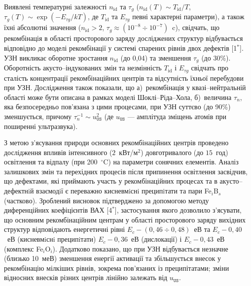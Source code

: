 Виявлені температурні залежності $n_\mathrm{id}$ та $\tau_g$
($n_{\mathrm{id}}(T) \sim T_{\mathrm{id}}/T$,
$\tau_{g}(T)\sim\exp\left(-E_{\tau g}/kT\right)$,
де $T_{\mathrm{id}}$ та $E_{\tau g}$ певні характерні параметри),
а також їхні абсолютні значення ($n_{\mathrm{id}}>2$, $\tau_{g}\approx(10^{-8}\div10^{-7})$~c),
свідчать, що рекомбінація в області просторового заряду досліджених структур
відбувається відповідно до
моделі рекомбінації у системі спарених рівнів двох дефектів
[1$^*$].
УЗН викликає оборотне зростання $n_\mathrm{id}$  (до 0,04) та зменшення $\tau_g$ (до 30\%).
Оборотність акусто--індукованих змін та незмінність $T_{\mathrm{id}}$ і $E_{\tau g}$
свідчать про
сталість концентрації рекомбінаційних центрів та відсутність їхньої перебудови при УЗН.
Дослідження також показали, що
а)~рекомбінація у квазі--нейтральній області може бути описана в рамках моделі Шоклі--Ріда--Хола,
б)~величина $\tau_n$, яка безпосередньо пов'язана з цими процесами,
при УЗН суттєво (до 90\%) зменшується,
причому
$\tau_{n}^{-1}\sim u_\mathtt{US}^2$ (де $u_\mathtt{US}$ --- амплітуда зміщень атомів при поширенні ультразвука).

З метою з'ясування природи основних рекомбінаційних центрів
 проведено дослідження впливів інтенсивного ($2$~кВт/м$^2$) довготривалого (до  $15$~год) освітлення
та відпалу (при 200~$^\circ$C) на параметри сонячних елементів.
Аналіз залишкових змін та перехідних процесів після припинення освітлення засвідчив, що дефектами, які приймають участь у рекомбінаційних процесах та в акусто--дефектнiй взаємодiї є переважно кисневмiснi преципiтати та
пари Fe$_i$B$_s$ (частково).
Зроблений висновок підтверджено за допомогою методу диференційних коефіцієнтів ВАХ
[4$^*$],
застосування якого дозволило з'ясувати, що основним рекомбінаційним центрам у області просторового заряду вихідних структур відповідають енергетичні рівні
$E_c-(0,46\div0,48)$~еВ та $E_c-0,40$~еВ (кисневмiснi преципiтати)
$E_c-0,36$~еВ (дислокації) і
$E_c-0,43$~еВ (комплекс Fe$_i$O$_i$).
Додатково показано, що
при УЗН відбувається незначне (близько 10~меВ) зменшення енергії активації та
збільшується внесок у рекомбінацію мілкіших рівнів, зокрема пов'язаних із преципітатами;
зміни відносних внесків різних центрів лінійно залежать від $u_\mathtt{US}$.

